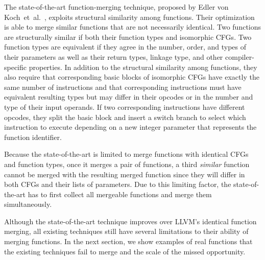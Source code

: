 The state-of-the-art function-merging technique, proposed by Edler von
Koch~et~al.~\cite{edler14}, exploits structural similarity among functions.
Their optimization is able to merge similar functions that are not necessarily
identical.
Two functions are structurally similar if both their function types and
isomorphic CFGs.
Two function types are equivalent
if they agree in the number, order, and types of their parameters as well as
their return types, linkage type, and other compiler-specific properties.
In addition to the structural similarity among functions, they also require
that corresponding basic blocks of isomorphic CFGs have exactly the same number
of instructions and that corresponding instructions must have equivalent
resulting types but may differ in their opcodes or in the number and type of
their input operands.
If two corresponding instructions have different opcodes, they split the basic
block and insert a switch branch to select which instruction to execute
depending on a new integer parameter that represents the function identifier.

Because the state-of-the-art is limited to merge functions with identical CFGs
and function types, once it merges a pair of functions, a third
\textit{similar} function cannot be merged with the resulting merged function
since they will differ in both CFGs and their lists of parameters.
Due to this limiting factor, the state-of-the-art has to first collect all
mergeable functions and merge them simultaneously.

Although the state-of-the-art technique improves over LLVM's identical
function merging, all existing techniques still have several limitations to
their ability of merging functions.
In the next section, we show examples of real functions that the existing
techniques fail to merge and the scale of the missed opportunity.

